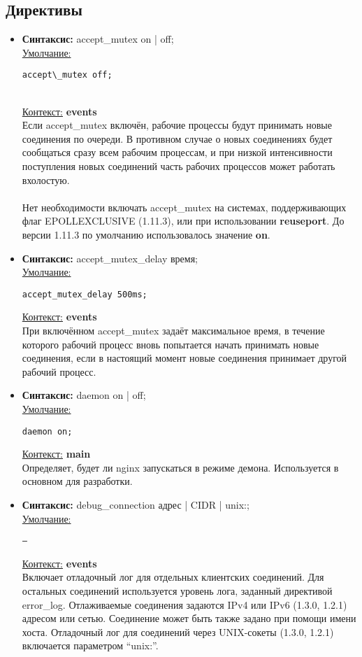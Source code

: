 \documentclass[a4paper,10pt,twoside]{article}
\begin{document}
\subsection{Директивы}

\begin{itemize}
 \item \textbf{Синтаксис:} accept\_mutex on | off;\\
\underline{Умолчание:} 
\begin{verbatim}
accept\_mutex off;
\end{verbatim} \\
\underline{Контекст:} \textbf{events}\\
Если accept\_mutex включён, рабочие процессы будут принимать новые соединения по очереди. В противном случае о новых соединениях будет сообщаться сразу всем рабочим процессам, и при низкой интенсивности поступления новых соединений часть рабочих процессов может работать вхолостую.\\
\\
Нет необходимости включать accept\_mutex на системах, поддерживающих флаг EPOLLEXCLUSIVE (1.11.3), или при использовании \textbf{reuseport}.
До версии 1.11.3 по умолчанию использовалось значение \textbf{on}.

\item \textbf{Синтаксис:} accept\_mutex\_delay время;\\
\underline{Умолчание:}
\begin{verbatim}
accept_mutex_delay 500ms;
\end{verbatim} 
\underline{Контекст:} \textbf{events}\\
При включённом accept\_mutex задаёт максимальное время, в течение которого рабочий процесс вновь попытается начать принимать новые соединения, если в настоящий момент новые соединения принимает другой рабочий процесс.

\item \textbf{Синтаксис:} daemon on | off;\\
\underline{Умолчание:}
\begin{verbatim}
daemon on;
\end{verbatim} 
\underline{Контекст:} \textbf{main}\\
Определяет, будет ли nginx запускаться в режиме демона. Используется в основном для разработки.
\item \textbf{Синтаксис:} debug\_connection адрес | CIDR | unix:;\\
\underline{Умолчание:}
\begin{verbatim}
—
\end{verbatim} 
\underline{Контекст:} \textbf{events}\\
Включает отладочный лог для отдельных клиентских соединений. Для остальных соединений используется уровень лога, заданный директивой error\_log. Отлаживаемые соединения задаются IPv4 или IPv6 (1.3.0, 1.2.1) адресом или сетью. Соединение может быть также задано при помощи имени хоста. Отладочный лог для соединений через UNIX-сокеты (1.3.0, 1.2.1) включается параметром “unix:”.


\end{itemize}
\end{document}
